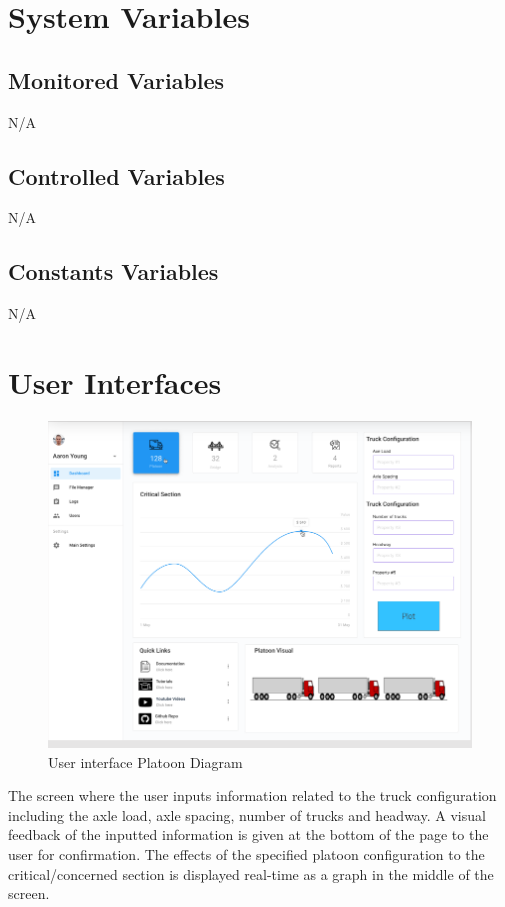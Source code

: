 \documentclass[12pt, titlepage]{article}
\begin{document}
\section{System Variables}

\subsection{Monitored Variables}
N/A
\subsection{Controlled Variables}
N/A
\subsection{Constants Variables}
N/A
\section{User Interfaces}
\begin{figure}[H]
  \includegraphics[]{../images/Userinterface-Platoon.PNG}
  \caption{User interface Platoon Diagram}
  \label{fig:userinterface-platoon-diagram}
\end{figure}
The screen where the user inputs information related to the truck configuration including the axle load, axle spacing, number of trucks and headway. A visual feedback of the inputted information is given at the bottom of the page to the user for confirmation. The effects of the specified platoon configuration to the critical/concerned section is displayed real-time as a graph in the middle of the screen. \\\\
\end{document}
